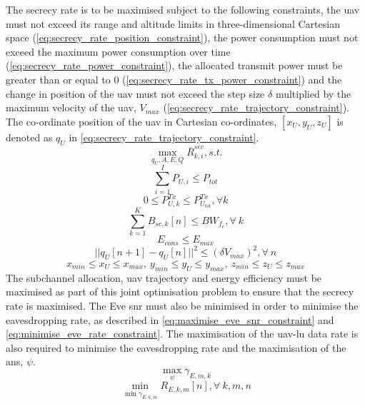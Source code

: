 The secrecy rate is to be maximised subject to the following constraints, the \acrshort{uav} must not exceed its range and altitude limits in three-dimensional Cartesian space (\ref{eq:secrecy_rate_position_constraint}), the power consumption must not exceed the maximum power consumption over time (\ref{eq:secrecy_rate_power_constraint}), the allocated transmit power must be greater than or equal to 0 (\ref{eq:secrecy_rate_tx_power_constraint}) and the change in position of the \acrshort{uav} must not exceed the step size $\delta$ multiplied by the maximum velocity of the \acrshort{uav}, $V_{max}$ (\ref{eq:secrecy_rate_trajectory_constraint}). 
The co-ordinate position of the \acrshort{uav} in Cartesian co-ordinates, $[x_{U}, y_{U}, z_{U}]$ is denoted as $q_{U}$ in \ref{eq:secrecy_rate_trajectory_constraint}.
\begin{equation} \label{eq:secrecy_rate_objective_function}
    \underset{q_{U}, A, E, Q}{\max}\bar{R}_{k, i}^{sec}, s.t.
\end{equation} 
\begin{equation} \label{eq:secrecy_rate_power_constraint}
    \sum_{i=1}^{I} P_{U, i} \le P_{tot}
\end{equation}
\begin{equation} \label{eq:secrecy_rate_tx_power_constraint}
    0 \le P_{U, k}^{Tx} \le P_{U_{tot}}^{Tx}, \forall k
\end{equation}
\begin{equation} \label{eq:secrecy_rate_subchannel_constraint}
    \sum_{k=1}^{K} B_{sc, k} [n] \le BW_{f_c}, \forall \ k
\end{equation}
\begin{equation} \label{eq:secrecy_rate_e_cons_constraint}
    E_{cons} \le E_{max}
\end{equation} 
\begin{equation} \label{eq:secrecy_rate_trajectory_constraint}
    ||q_{U}[n+1] - q_{U}[n]||^2 \le (\delta V_{max})^2, \forall \ n
\end{equation} 
\begin{equation} \label{eq:secrecy_rate_position_constraint}
    x_{min} \le x_{U} \le x_{max}
    ,\  
    y_{min} \le y_{U} \le y_{max}
    ,\  
    z_{min} \le z_{U} \le z_{max}
\end{equation}
The subchannel allocation, \acrshort{uav} trajectory and energy efficiency must be maximised as part of this joint optimisation problem to ensure that the secrecy rate is maximised. 
The Eve \acrshort{snr} must also be minimised in order to minimise the eavesdropping rate, as described in \ref{eq:maximise_eve_snr_constraint} and \ref{eq:minimise_eve_rate_constraint}. 
The maximisation of the \acrshort{uav}-\acrshort{lu} data rate is also required to minimise the eavesdropping rate and the maximisation of the \acrshort{ans}, $\psi$. 
\begin{equation} \label{eq:maximise_eve_snr_constraint}
   \underset{\psi}{\max}\gamma_{E, m, k}
\end{equation}
\begin{equation} \label{eq:minimise_eve_rate_constraint}
   \underset{\min \gamma_{E, k, m}}{\min} R_{E, k, m} [n], \forall \ k, m, n
\end{equation}
